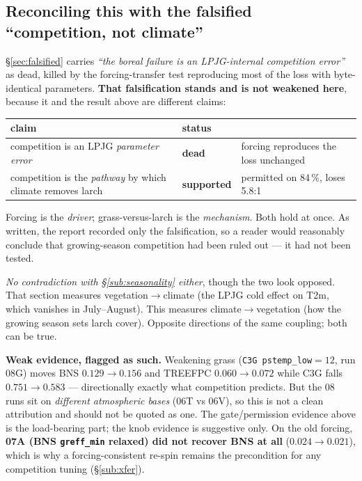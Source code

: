 \documentclass[10pt]{article}
\begin{document}
\subsection{Reconciling this with the falsified ``competition, not climate''}\label{sub:compreconcile}
\S\ref{sec:falsified} carries \emph{``the boreal failure is an LPJG-internal competition
error''} as dead, killed by the forcing-transfer test reproducing most of the loss with
byte-identical parameters. \textbf{That falsification stands and is not weakened here}, because
it and the result above are different claims:

\begin{center}\footnotesize
\begin{tabular}{l l l}
\toprule
claim & status & \\
\midrule
competition is an LPJG \emph{parameter error} & \textbf{dead} & forcing reproduces the loss unchanged \\
competition is the \emph{pathway} by which climate removes larch & \textbf{supported} & permitted on 84\,\%, loses 5.8:1 \\
\bottomrule
\end{tabular}
\end{center}

\noindent Forcing is the \emph{driver}; grass-versus-larch is the \emph{mechanism}. Both hold
at once. As written, the report recorded only the falsification, so a reader would reasonably
conclude that growing-season competition had been ruled out --- it had not been tested.

\emph{No contradiction with \S\ref{sub:seasonality} either}, though the two look opposed. That
section measures vegetation$\to$climate (the LPJG cold effect on T2m, which vanishes in
July--August). This measures climate$\to$vegetation (how the growing season sets larch cover).
Opposite directions of the same coupling; both can be true.

\textbf{Weak evidence, flagged as such.} Weakening grass (\texttt{C3G pstemp\_low}$=12$, run
08G) moves BNS $0.129\to0.156$ and TREEFPC $0.060\to0.072$ while C3G falls $0.751\to0.583$ ---
directionally exactly what competition predicts. But the 08 runs sit on \emph{different
atmospheric bases} (06T vs 06V), so this is not a clean attribution and should not be quoted as
one. The gate/permission evidence above is the load-bearing part; the knob evidence is
suggestive only. On the old forcing, \textbf{07A (BNS \texttt{greff\_min} relaxed) did not
recover BNS at all} ($0.024\to0.021$), which is why a forcing-consistent re-spin remains the
precondition for any competition tuning (\S\ref{sub:xfer}).
\end{document}
